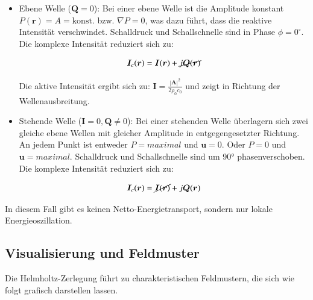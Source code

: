 \begin{itemize}


 
\item Ebene Welle ($\boldsymbol{Q} = 0$):
Bei einer ebene Welle ist die Amplitude konstant $P(\boldsymbol{r})
= A = \text{konst.}$ bzw. $\nabla P = 0$, was dazu führt, dass die
reaktive Intensität verschwindet. Schalldruck und Schallschnelle
sind in Phase $\phi = 0^{\circ}$. Die komplexe Intensität reduziert
sich zu:
 
\begin{equation}
\boldsymbol{I}_c (\boldsymbol{r})
=
\boldsymbol{I}(\boldsymbol{r}) + \cancel{j\boldsymbol{Q}(\boldsymbol{r})}
\end{equation}
 
Die aktive Intensität ergibt sich zu: $\boldsymbol{I} = \frac{|\boldsymbol{A}|^2}{2 \rho_0 c_0}$ und zeigt in Richtung der Wellenausbreitung.
 
\item Stehende Welle ($\boldsymbol{I} = 0, \boldsymbol{Q} \neq 0$): 
Bei einer stehenden Welle überlagern sich zwei gleiche ebene Wellen mit gleicher Amplitude in entgegengesetzter Richtung. An jedem Punkt ist entweder $P = maximal$ und $\boldsymbol{u} = 0$. Oder $P = 0$ und $\boldsymbol{u} = maximal$. Schalldruck und Schallschnelle sind um 90° phasenverschoben. Die komplexe Intensität reduziert sich zu:
 
\begin{equation}
\boldsymbol{I}_c (\boldsymbol{r})
=
\cancel{\boldsymbol{I}(\boldsymbol{r})} + j\boldsymbol{Q}(\boldsymbol{r})
\end{equation}

\end{itemize}
In diesem Fall gibt es keinen Netto-Energietransport, sondern nur lokale Energieoszillation.


\subsection{Visualisierung und Feldmuster
\label{helmholtz:subsection:Visualisierung}}
Die Helmholtz-Zerlegung führt zu charakteristischen Feldmustern, die sich wie folgt grafisch darstellen lassen.
 
